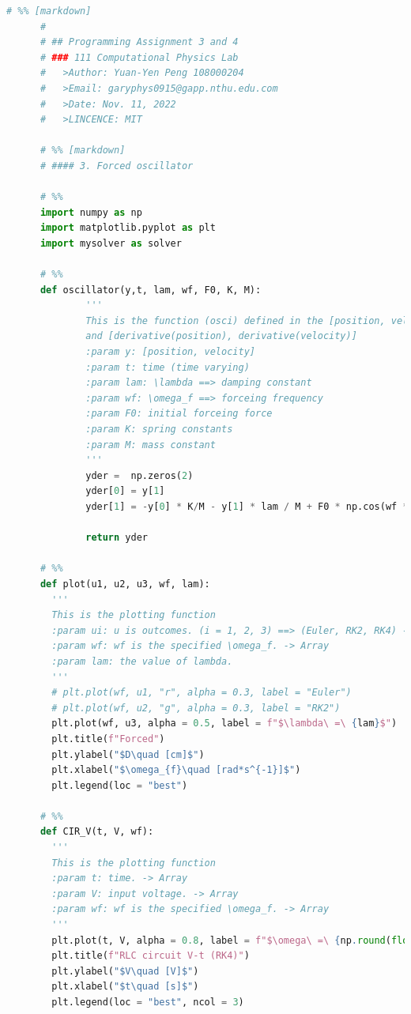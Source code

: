 \documentclass[12pt]{article}
\begin{document}
      \begin{lstlisting}[language={Python}]
      # %% [markdown]
      # 
      # ## Programming Assignment 3 and 4
      # ### 111 Computational Physics Lab  
      #   >Author: Yuan-Yen Peng 108000204  
      #   >Email: garyphys0915@gapp.nthu.edu.com  
      #   >Date: Nov. 11, 2022  
      #   >LINCENCE: MIT

      # %% [markdown]
      # #### 3. Forced oscillator

      # %%
      import numpy as np
      import matplotlib.pyplot as plt
      import mysolver as solver

      # %%
      def oscillator(y,t, lam, wf, F0, K, M):
              '''
              This is the function (osci) defined in the [position, velocity] 
              and [derivative(position), derivative(velocity)]
              :param y: [position, velocity]
              :param t: time (time varying)
              :param lam: \lambda ==> damping constant
              :param wf: \omega_f ==> forceing frequency
              :param F0: initial forceing force
              :param K: spring constants
              :param M: mass constant
              '''
              yder =  np.zeros(2)
              yder[0] = y[1]
              yder[1] = -y[0] * K/M - y[1] * lam / M + F0 * np.cos(wf * t) / M # the difinition of the acceleration, which is depend on the position.

              return yder

      # %%
      def plot(u1, u2, u3, wf, lam):
        '''
        This is the plotting function
        :param ui: u is outcomes. (i = 1, 2, 3) ==> (Euler, RK2, RK4) -> Array
        :param wf: wf is the specified \omega_f. -> Array
        :param lam: the value of lambda. 
        '''
        # plt.plot(wf, u1, "r", alpha = 0.3, label = "Euler")
        # plt.plot(wf, u2, "g", alpha = 0.3, label = "RK2")
        plt.plot(wf, u3, alpha = 0.5, label = f"$\lambda\ =\ {lam}$")
        plt.title(f"Forced")
        plt.ylabel("$D\quad [cm]$")
        plt.xlabel("$\omega_{f}\quad [rad*s^{-1}]$")
        plt.legend(loc = "best")

      # %%
      def CIR_V(t, V, wf):
        '''
        This is the plotting function
        :param t: time. -> Array
        :param V: input voltage. -> Array
        :param wf: wf is the specified \omega_f. -> Array
        '''
        plt.plot(t, V, alpha = 0.8, label = f"$\omega\ =\ {np.round(float(wf), 2)}$")
        plt.title(f"RLC circuit V-t (RK4)")
        plt.ylabel("$V\quad [V]$")
        plt.xlabel("$t\quad [s]$")
        plt.legend(loc = "best", ncol = 3)
        

\end{lstlisting}
\end{document}
